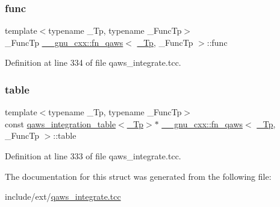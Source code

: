 \subsubsection{\texorpdfstring{func}{func}}
{\footnotesize\ttfamily template$<$typename \+\_\+\+Tp, typename \+\_\+\+Func\+Tp$>$ \\
\+\_\+\+Func\+Tp \hyperlink{struct____gnu__cxx_1_1fn__qaws}{\+\_\+\+\_\+gnu\+\_\+cxx\+::fn\+\_\+qaws}$<$ \hyperlink{namespace____gnu__cxx_a3b19a9c800ca194374ef9172290f7d79}{\+\_\+\+Tp}, \+\_\+\+Func\+Tp $>$\+::func}



Definition at line 334 of file qaws\+\_\+integrate.\+tcc.

\mbox{\label{struct____gnu__cxx_1_1fn__qaws_a8a96359bac745cd83938fc0735a9168d}} 
\subsubsection{\texorpdfstring{table}{table}}
{\footnotesize\ttfamily template$<$typename \+\_\+\+Tp, typename \+\_\+\+Func\+Tp$>$ \\
const \hyperlink{struct____gnu__cxx_1_1qaws__integration__table}{qaws\+\_\+integration\+\_\+table}$<$\hyperlink{namespace____gnu__cxx_a3b19a9c800ca194374ef9172290f7d79}{\+\_\+\+Tp}$>$$\ast$ \hyperlink{struct____gnu__cxx_1_1fn__qaws}{\+\_\+\+\_\+gnu\+\_\+cxx\+::fn\+\_\+qaws}$<$ \hyperlink{namespace____gnu__cxx_a3b19a9c800ca194374ef9172290f7d79}{\+\_\+\+Tp}, \+\_\+\+Func\+Tp $>$\+::table}



Definition at line 333 of file qaws\+\_\+integrate.\+tcc.



The documentation for this struct was generated from the following file\+:\begin{DoxyCompactItemize}
\item 
include/ext/\hyperlink{qaws__integrate_8tcc}{qaws\+\_\+integrate.\+tcc}\end{DoxyCompactItemize}
